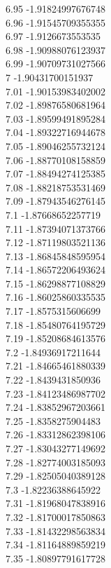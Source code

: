 {6.95	-1.91824997676748\\
6.96	-1.91545709355355\\
6.97	-1.9126673553535\\
6.98	-1.90988076123937\\
6.99	-1.90709731027566\\
7	-1.90431700151937\\
7.01	-1.90153983402002\\
7.02	-1.89876580681964\\
7.03	-1.89599491895284\\
7.04	-1.89322716944678\\
7.05	-1.89046255732124\\
7.06	-1.88770108158859\\
7.07	-1.88494274125385\\
7.08	-1.88218753531469\\
7.09	-1.87943546276145\\
7.1	-1.87668652257719\\
7.11	-1.87394071373766\\
7.12	-1.87119803521136\\
7.13	-1.86845848595954\\
7.14	-1.86572206493624\\
7.15	-1.86298877108829\\
7.16	-1.86025860335535\\
7.17	-1.8575315606699\\
7.18	-1.85480764195729\\
7.19	-1.85208684613576\\
7.2	-1.84936917211644\\
7.21	-1.84665461880339\\
7.22	-1.8439431850936\\
7.23	-1.84123486987702\\
7.24	-1.83852967203661\\
7.25	-1.8358275904483\\
7.26	-1.83312862398106\\
7.27	-1.83043277149692\\
7.28	-1.82774003185093\\
7.29	-1.82505040389128\\
7.3	-1.82236388645922\\
7.31	-1.81968047838916\\
7.32	-1.81700017850863\\
7.33	-1.81432298563834\\
7.34	-1.81164889859219\\
7.35	-1.80897791617728\\
}
